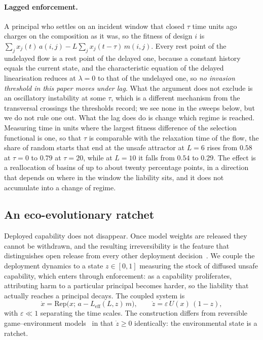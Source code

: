 \documentclass[11pt,a4paper]{article}
\theoremstyle{definition}
\begin{document}


\paragraph{Lagged enforcement.}
A principal who settles on an incident window that closed $\tau$ time units
ago charges on the composition as it was, so the fitness of design $i$ is
$\sum_j x_j(t)\,a(i,j)-L\sum_j x_j(t-\tau)\,m(i,j)$. Every rest point of the
undelayed flow is a rest point of the delayed one, because a constant history
equals the current state, and the characteristic equation of the delayed
linearisation reduces at $\lambda=0$ to that of the undelayed one, so
\emph{no invasion threshold in this paper moves under lag}. What the argument
does not exclude is an oscillatory instability at some $\tau$, which is a
different mechanism from the transversal crossings the thresholds record; we
see none in the sweeps below, but we do not rule one out. What the lag does do
is change which regime is reached. Measuring time in units
where the largest fitness difference of the selection functional is one, so
that $\tau$ is comparable with the relaxation time of the flow, the share of
random starts that end at the unsafe attractor at $L=6$ rises from $0.58$ at
$\tau=0$ to $0.79$ at $\tau=20$, while at $L=10$ it falls from $0.54$ to
$0.29$. The effect is a reallocation of basins of up to about twenty
percentage points, in a direction that depends on where in the window the
liability sits, and it does not accumulate into a change of regime.

\subsection{An eco-evolutionary ratchet}\label{sec:ratchet}

Deployed capability does not disappear. Once model weights are released they
cannot be withdrawn, and the resulting irreversibility is the feature that
distinguishes open release from every other deployment
decision~\citep{seger2023opensourcing,kapoor2024societal}. We couple the
deployment dynamics to a
state $z\in[0,1]$ measuring the stock of diffused unsafe capability, which
enters through enforcement: as a capability proliferates, attributing harm to
a particular principal becomes harder, so the liability that actually reaches
a principal decays. The coupled system is
\begin{equation}
\dot{x}=\mathrm{Rep}\big(x;\,a-L_{\mathrm{eff}}(L,z)\,m\big),
\qquad
\dot{z}=\varepsilon\,U(x)\,(1-z),
\label{eq:coupled}
\end{equation}
with $\varepsilon\ll 1$ separating the time scales. The construction differs
from reversible game--environment models~\citep{weitz2016oscillating,hauert2019asymmetric,tilman2020feedbacks} in that
$\dot z\ge 0$ identically: the environmental state is a ratchet.
\end{document}
